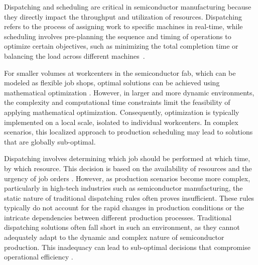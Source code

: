 
Dispatching and scheduling are critical in semiconductor manufacturing because they directly impact the throughput and utilization of resources. Dispatching refers to the process of assigning work to specific machines in real-time, while scheduling involves pre-planning the sequence and timing of operations to optimize certain objectives, such as minimizing the total completion time or balancing the load across different machines~\cite{schumann2022scheduling}.

For smaller volumes at workcenters in the semiconductor fab, which can be modeled as flexible job shops, optimal solutions can be achieved using mathematical optimization \cite{waschneck2018deep}. However, in larger and more dynamic environments, the complexity and computational time constraints limit the feasibility of applying mathematical optimization. Consequently, optimization is typically implemented on a local scale, isolated to individual workcenters. In complex scenarios, this localized approach to production scheduling may lead to solutions that are globally sub-optimal.

Dispatching involves determining which job should be performed at which time, by which resource. This decision is based on the availability of resources and the urgency of job orders \cite{Hopp2011}. However, as production scenarios become more complex, particularly in high-tech industries such as semiconductor manufacturing, the static nature of traditional dispatching rules often proves insufficient. These rules typically do not account for the rapid changes in production conditions or the intricate dependencies between different production processes.  
Traditional dispatching solutions often fall short in such an environment, as they cannot adequately adapt to the dynamic and complex nature of semiconductor production. This inadequacy can lead to sub-optimal decisions that compromise operational efficiency \cite{Uzsoy1992}.

